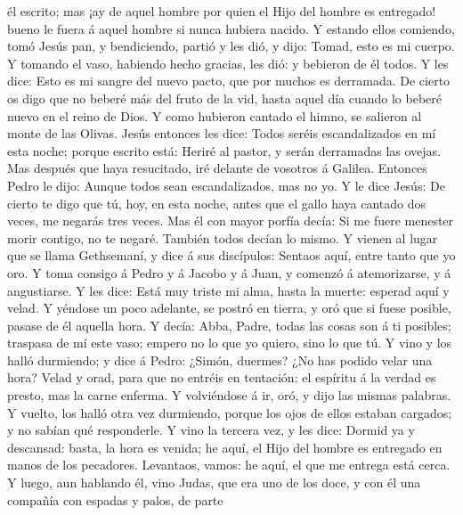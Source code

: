 él escrito; mas ¡ay de aquel hombre por quien el Hijo del hombre es
entregado! bueno le fuera á aquel hombre si nunca hubiera nacido.
 Y estando ellos comiendo, tomó Jesús pan, y bendiciendo,
partió y les dió, y dijo: Tomad, esto es mi cuerpo.  Y
tomando el vaso, habiendo hecho gracias, les dió: y bebieron de él
todos.  Y les dice: Esto es mi sangre del nuevo pacto,
que por muchos es derramada.  De cierto os digo que no
beberé más del fruto de la vid, hasta aquel día cuando lo beberé nuevo
en el reino de Dios.  Y como hubieron cantado el himno,
se salieron al monte de las Olivas.  Jesús entonces les
dice: Todos seréis escandalizados en mí esta noche; porque escrito está:
Heriré al pastor, y serán derramadas las ovejas.  Mas
después que haya resucitado, iré delante de vosotros á Galilea.
 Entonces Pedro le dijo: Aunque todos sean
escandalizados, mas no yo.  Y le dice Jesús: De cierto te
digo que tú, hoy, en esta noche, antes que el gallo haya cantado dos
veces, me negarás tres veces.  Mas él con mayor porfía
decía: Si me fuere menester morir contigo, no te negaré. También todos
decían lo mismo.  Y vienen al lugar que se llama
Gethsemaní, y dice á sus discípulos: Sentaos aquí, entre tanto que yo
oro.  Y toma consigo á Pedro y á Jacobo y á Juan, y
comenzó á atemorizarse, y á angustiarse.  Y les dice:
Está muy triste mi alma, hasta la muerte: esperad aquí y velad.
 Y yéndose un poco adelante, se postró en tierra, y oró
que si fuese posible, pasase de él aquella hora.  Y
decía: Abba, Padre, todas las cosas son á ti posibles; traspasa de mí
este vaso; empero no lo que yo quiero, sino lo que tú.  Y
vino y los halló durmiendo; y dice á Pedro: ¿Simón, duermes? ¿No has
podido velar una hora?  Velad y orad, para que no entréis
en tentación: el espíritu á la verdad es presto, mas la carne enferma.
 Y volviéndose á ir, oró, y dijo las mismas palabras.
 Y vuelto, los halló otra vez durmiendo, porque los ojos
de ellos estaban cargados; y no sabían qué responderle. 
Y vino la tercera vez, y les dice: Dormid ya y descansad: basta, la hora
es venida; he aquí, el Hijo del hombre es entregado en manos de los
pecadores.  Levantaos, vamos: he aquí, el que me entrega
está cerca.  Y luego, aun hablando él, vino Judas, que
era uno de los doce, y con él una compañía con espadas y palos, de parte
